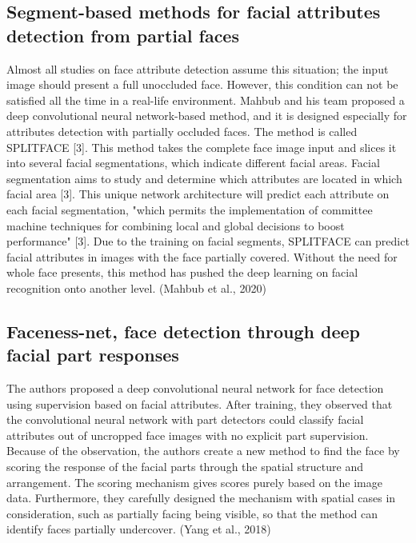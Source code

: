 \documentclass{article}
\begin{document}
\subsection{Segment-based methods for facial attributes detection from partial faces}
Almost all studies on face attribute detection assume this situation; the input image should present a full unoccluded face. However, this condition can not be satisfied all the time in a real-life environment. Mahbub and his team proposed a deep convolutional neural network-based method, and it is designed especially for attributes detection with partially occluded faces. The method is called SPLITFACE [3]. This method takes the complete face image input and slices it into several facial segmentations, which indicate different facial areas. Facial segmentation aims to study and determine which attributes are located in which facial area [3]. This unique network architecture will predict each attribute on each facial segmentation, "which permits the implementation of committee machine techniques for combining local and global decisions to boost performance" [3]. Due to the training on facial segments, SPLITFACE can predict facial attributes in images with the face partially covered. Without the need for whole face presents, this method has pushed the deep learning on facial recognition onto another level. (Mahbub et al., 2020)

\subsection{Faceness-net, face detection through deep facial part responses}
The authors proposed a deep convolutional neural network for face detection using supervision based on facial attributes. After training, they observed that the convolutional neural network with part detectors could classify facial attributes out of uncropped face images with no explicit part supervision. Because of the observation, the authors create a new method to find the face by scoring the response of the facial parts through the spatial structure and arrangement. The scoring mechanism gives scores purely based on the image data. Furthermore, they carefully designed the mechanism with spatial cases in consideration, such as partially facing being visible, so that the method can identify faces partially undercover. (Yang et al., 2018)
\end{document}
